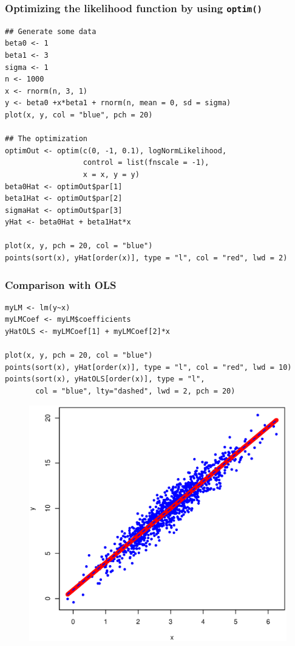 \documentclass[10pt]{beamer}
\begin{document}
\begin{frame}[fragile]
  \frametitle{Optimizing the likelihood function by using \texttt{optim()}}



\begin{verbatim}
## Generate some data
beta0 <- 1
beta1 <- 3
sigma <- 1
n <- 1000
x <- rnorm(n, 3, 1)
y <- beta0 +x*beta1 + rnorm(n, mean = 0, sd = sigma)
plot(x, y, col = "blue", pch = 20)

## The optimization
optimOut <- optim(c(0, -1, 0.1), logNormLikelihood,
                  control = list(fnscale = -1),
                  x = x, y = y)
beta0Hat <- optimOut$par[1]
beta1Hat <- optimOut$par[2]
sigmaHat <- optimOut$par[3]
yHat <- beta0Hat + beta1Hat*x

plot(x, y, pch = 20, col = "blue")
points(sort(x), yHat[order(x)], type = "l", col = "red", lwd = 2)
\end{verbatim}
\end{frame}


\begin{frame}[fragile]
\frametitle{Comparison with OLS}

\begin{verbatim}
myLM <- lm(y~x)
myLMCoef <- myLM$coefficients
yHatOLS <- myLMCoef[1] + myLMCoef[2]*x

plot(x, y, pch = 20, col = "blue")
points(sort(x), yHat[order(x)], type = "l", col = "red", lwd = 10)
points(sort(x), yHatOLS[order(x)], type = "l",
       col = "blue", lty="dashed", lwd = 2, pch = 20)
\end{verbatim}
\end{frame}


\begin{frame}[plain]
  \begin{figure}
    \centering
    \includegraphics[height=\textheight]{OLSvsML}
  \end{figure}
\end{frame}
\end{document}
